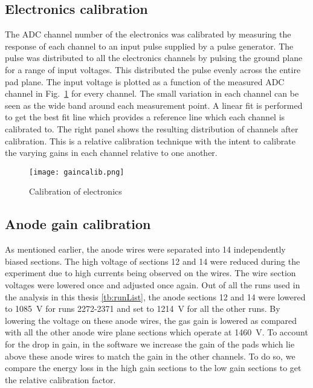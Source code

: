 

\subsection{Electronics calibration}
The ADC channel number of the electronics was calibrated by measuring the response of each channel to an input pulse supplied by a pulse generator. The pulse was distributed to all the electronics channels by pulsing the ground plane for a range of input voltages. This distributed the pulse evenly across the entire pad plane. The input voltage is plotted as a function of the measured ADC channel in Fig.~\ref{fig:gaincalib} for every channel. The small variation in each channel can be seen as the wide band around each measurement point. A linear fit is performed to get the best fit line which provides a reference line which each channel is calibrated to. The right panel shows the resulting distribution of channels after calibration. This is a relative calibration technique with the intent to calibrate the varying gains in each channel relative to one another. 

\begin{figure}[H]
\texttt{[image: gaincalib.png]}
\caption{Calibration of electronics}
\label{fig:gaincalib}
\end{figure}

\subsection{Anode gain calibration}

As mentioned earlier, the anode wires were separated into 14 independently biased sections. The high voltage of sections 12 and 14 were reduced during the experiment due to high currents being observed on the wires. The wire section voltages were lowered once and adjusted once again. Out of all the runs used in the analysis in this thesis \ref{tb:runList}, the anode sections 12 and 14 were lowered to \SI{1085}{\volt} for runs 2272-2371 and set to \SI{1214}{\volt} for all the other runs. By lowering the voltage on these anode wires, the gas gain is lowered as compared with all the other anode wire plane sections which operate at \SI{1460}{\volt}. To account for the drop in gain, in the software we increase the gain of the pads which lie above these anode wires to match the gain in the other channels. To do so, we compare the energy loss in the high gain sections to the low gain sections to get the relative calibration factor. 


